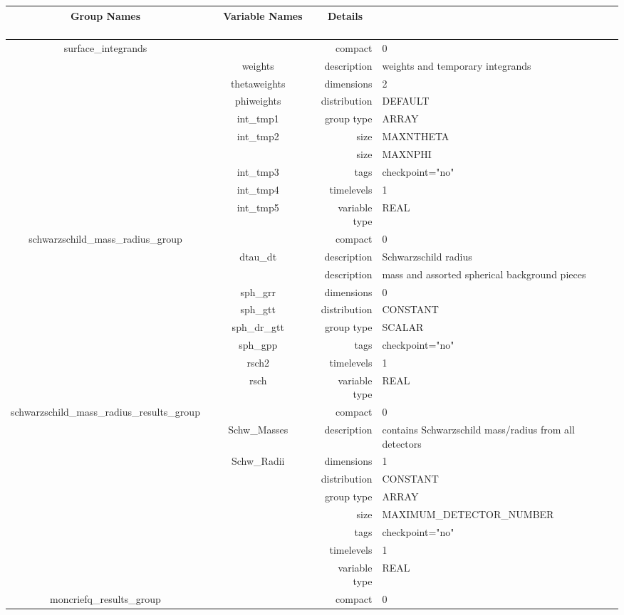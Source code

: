 \documentclass{article}
\begin{document}
\begin{tabular*}{150mm}{|c|c@{\extracolsep{\fill}}|rl|} \hline 
~ {\bf Group Names} ~ & ~ {\bf Variable Names} ~  &{\bf Details} ~ & ~ \\ 
\hline 
surface\_integrands &  & compact & 0 \\ 
 & weights & description & weights and temporary integrands \\ 
 & thetaweights & dimensions & 2 \\ 
 & phiweights & distribution & DEFAULT \\ 
 & int\_tmp1 & group type & ARRAY \\ 
 & int\_tmp2 & size & MAXNTHETA \\ 
& ~ & size & MAXNPHI \\ 
 & int\_tmp3 & tags & checkpoint="no" \\ 
 & int\_tmp4 & timelevels & 1 \\ 
 & int\_tmp5 & variable type & REAL \\ 
\hline 
schwarzschild\_mass\_radius\_group &  & compact & 0 \\ 
 & dtau\_dt & description & Schwarzschild radius \\ 
& ~ & description &  mass and assorted spherical background pieces \\ 
 & sph\_grr & dimensions & 0 \\ 
 & sph\_gtt & distribution & CONSTANT \\ 
 & sph\_dr\_gtt & group type & SCALAR \\ 
 & sph\_gpp & tags & checkpoint="no" \\ 
 & rsch2 & timelevels & 1 \\ 
 & rsch & variable type & REAL \\ 
\hline 
schwarzschild\_mass\_radius\_results\_group &  & compact & 0 \\ 
 & Schw\_Masses & description & contains Schwarzschild mass/radius from all detectors \\ 
 & Schw\_Radii & dimensions & 1 \\ 
 &  & distribution & CONSTANT \\ 
 &  & group type & ARRAY \\ 
 &  & size & MAXIMUM\_DETECTOR\_NUMBER \\ 
 &  & tags & checkpoint="no" \\ 
 &  & timelevels & 1 \\ 
 &  & variable type & REAL \\ 
\hline 
moncriefq\_results\_group &  & compact & 0 \\ 

\end{tabular*}
\end{document}
